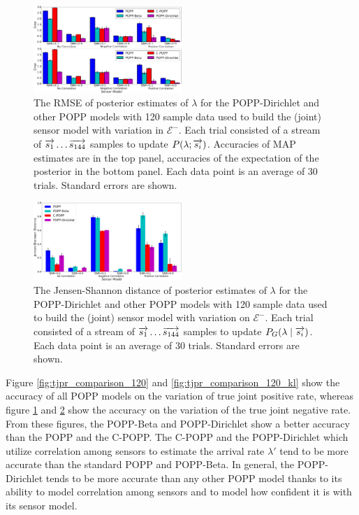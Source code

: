 \begin{figure}[t!]
	\centering
	\includegraphics[width=0.5\textwidth]{./figures/tjnr_comparison_120.png}
    \caption{The RMSE of posterior estimates of $\lambda$ for the POPP-Dirichlet and other POPP models with 120 sample data used to build the (joint) sensor model with variation in $\mathcal{E^-}$. Each trial consisted of a stream of $\protect\overrightarrow{s_1} \ldots \protect\overrightarrow{s_{144}}$ samples to update $P(\lambda ; \protect\overrightarrow{s_i})$. Accuracies of MAP estimates are  in the top panel, accuracies of the expectation of the posterior in the bottom panel. Each data point is an average of 30 trials. Standard errors are shown.} 
	\label{fig:tjnr_comparison_120}
\end{figure}

\begin{figure}[t!]
	\centering
	\includegraphics[width=0.5\textwidth]{./figures/tjnr_comparison_120_kl.png}
	\caption{The Jensen-Shannon distance of posterior estimates of $\lambda$ for the POPP-Dirichlet and other POPP models with 120 sample data used to build the (joint) sensor model with variation on $\mathcal{E^-}$. Each trial consisted of a stream of $\protect\overrightarrow{s_1} \ldots \protect\overrightarrow{s_{144}}$ samples to update $P_G(\lambda \mid \protect\overrightarrow{s_i})$. Each data point is an average of 30 trials. Standard errors are shown.} 
	\label{fig:tjnr_comparison_120_kl}
\end{figure}

Figure \ref{fig:tjpr_comparison_120} and \ref{fig:tjpr_comparison_120_kl} show the accuracy of all POPP models on the variation of true joint positive rate, whereas figure \ref{fig:tjnr_comparison_120} and \ref{fig:tjnr_comparison_120_kl} show the accuracy on the variation of the true joint negative rate. From these figures, the POPP-Beta and POPP-Dirichlet show a better accuracy than the POPP and the C-POPP. The C-POPP and the POPP-Dirichlet which utilize correlation among sensors to estimate the arrival rate $\lambda'$ tend to be more accurate than the standard POPP and POPP-Beta.
In general, the POPP-Dirichlet tends to be more accurate than any other POPP model thanks to its ability to model correlation among sensors and to model how confident it is with its sensor model.
